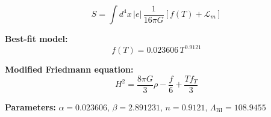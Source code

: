 
\begin{equation}
  S = \int d^4x \, |e| \, \frac{1}{16\pi G} \left[ f(T) + \mathcal{L}_m \right]
\end{equation}

\textbf{Best-fit model:}
\begin{equation}
  f(T) = 0.023606 \, T^{0.9121}
\end{equation}

\textbf{Modified Friedmann equation:}
\begin{equation}
  H^2 = \frac{8\pi G}{3} \rho - \frac{f}{6} + \frac{T f_T}{3}
\end{equation}

\textbf{Parameters:}
$\alpha = 0.023606$, \quad
$\beta = 2.891231$, \quad
$n = 0.9121$, \quad
$\Lambda_{\text{BI}} = 108.9455$